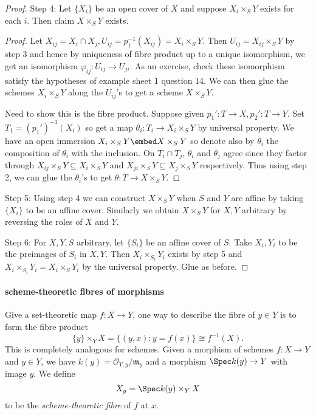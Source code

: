 \documentclass[a4paper]{article}
\newcommand{\sh}[1]{\mathcal{#1}} %
\begin{document}
\begin{proof}
  Step 4: Let \(\{X_i\}\) be an open cover of \(X\) and suppose \(X_i \times_S Y\) exists for each \(i\). Then claim \(X \times_S Y\) exists.
  \begin{proof}
    Let \(X_{ij} = X_i \cap X_j, U_{ij} = p_1^{-1}(X_{ij}) = X_i \times_S Y\). Then \(U_{ij} = X_{ij} \times_S Y\) by step 3 and hence by uniqueness of fibre product up to a unique isomorphism, we get an isomorphism \(\varphi_{ij}: U_{ij} \to U_{ji}\). As an exercise, check these isomorphism satisfy the hypotheses of example sheet 1 question 14. We can then glue the schemes \(X_i \times_S Y\) along the \(U_{ij}\)'s to get a scheme \(X \times_S Y\).

    Need to show this is the fibre product. Suppose given \(p_1': T \to X, p_2': T \to Y\). Set \(T_1 = (p_1')^{-1}(X_i)\) so get a map \(\theta_i: T_i \to X_i \times_S Y\) by universal property. We have an open immersion \(X_i \times_S Y \embed X \times_S Y\) so denote also by \(\theta_i\) the composition of \(\theta_i\) with the inclusion. On \(T_i \cap T_j\), \(\theta_i\) and \(\theta_j\) agree since they factor through \(X_{ij} \times_S Y \subseteq X_i \times_S Y\) and \(X_{ji} \times_S Y \subseteq X_j \times_S Y\) respectively. Thus using step 2, we can glue the \(\theta_i\)'s to get \(\theta: T \to X \times_S Y\).
  \end{proof}

  Step 5: Using step 4 we can construct \(X \times_S Y\) when \(S\) and \(Y\) are affine by taking \(\{X_i\}\) to be an affine cover. Similarly we obtain \(X \times_S Y\) for \(X, Y\) arbitrary by reversing the roles of \(X\) and \(Y\).

  Step 6: For \(X, Y, S\) arbitrary, let \(\{S_i\}\) be an affine cover of \(S\). Take \(X_i, Y_i\) to be the preimages of \(S_i\) in \(X, Y\). Then \(X_i \times_{S_i} Y_i\) exists by step 5 and \(X_i \times_{S_i} Y_i = X_i \times_S Y_i\) by the universal property. Glue as before.
\end{proof}

\paragraph{scheme-theoretic fibres of morphisms}

Give a set-theoretic map \(f: X \to Y\), one way to describe the fibre of \(y \in Y\) is to form the fibre product
\[
  \{y\} \times_Y X = \{(y, x): y = f(x)\} \cong f^{-1}(X).
\]
This is completely analogous for schemes. Given a morphism of schemes \(f: X \to Y\) and \(y \in Y\), we have \(k(y) = \sh O_{Y, y}/\mathfrak m_y\) and a morphism \(\Spec k(y) \to Y\) with image \(y\). We define
\[
  X_y = \Spec k(y) \times_Y X
\]
to be the \emph{scheme-theoretic fibre} of \(f\) at \(x\).
\end{document}
